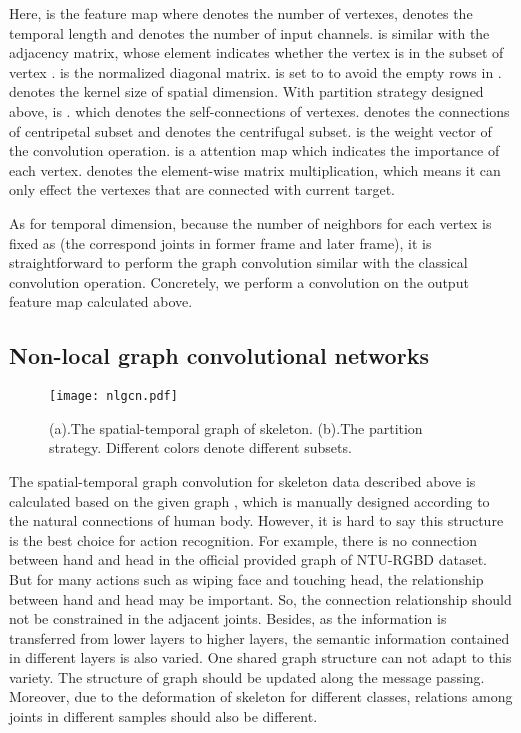 \documentclass[10pt,twocolumn,letterpaper]{article}
\begin{document}
    Here,  is the  feature map where  denotes the number of vertexes,  denotes the temporal length and  denotes the number of input channels.  is similar with the  adjacency matrix, whose element  indicates whether the vertex  is in the subset of vertex .  is the normalized diagonal matrix.  is set to  to avoid the empty rows in .  denotes the kernel size of spatial dimension. With partition strategy designed above,  is .  which denotes the self-connections of vertexes.  denotes the connections of centripetal subset and  denotes the centrifugal subset.  is the  weight vector of the  convolution operation.  is a  attention map which indicates the importance of each vertex.  denotes the element-wise matrix multiplication, which means it can only effect the vertexes that are connected with current target.
    
    As for temporal dimension, because the number of neighbors for each vertex is fixed as  (the correspond joints in former frame and later frame), it is straightforward to perform the graph convolution similar with the classical convolution operation. Concretely, we perform a  convolution on the output feature map calculated above.
    
	\subsection{Non-local graph convolutional networks}
    \label{nlgcn}
    
    \begin{figure}[tb]
	\begin{center}
	\texttt{[image: nlgcn.pdf]}
	\caption{(a).The spatial-temporal graph of skeleton. (b).The partition strategy. Different colors denote different subsets.}
	\label{fig:nlgcn}	
	\end{center}
	\end{figure}

    The spatial-temporal graph convolution for skeleton data described above is calculated based on the given graph , which is manually designed according to the natural connections of human body. However, it is hard to say this structure is the best choice for action recognition. For example, there is no connection between hand and head in the official provided graph of NTU-RGBD dataset. But for many actions such as wiping face and touching head, the relationship between hand and head may be important. So, the connection relationship should not be constrained in the adjacent joints.
Besides, as the information is transferred from lower layers to higher layers, the semantic information contained in different layers is also varied. One shared graph structure can not adapt to this variety. The structure of graph should be updated along the message passing. Moreover, due to the deformation of skeleton for different classes, relations among joints in different samples should also be different. 
\end{document}
